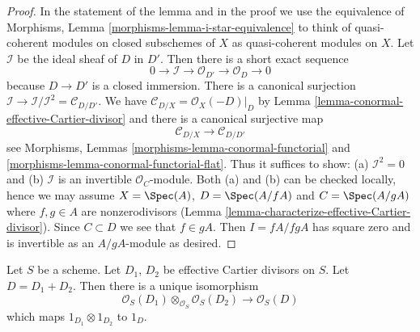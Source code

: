 \begin{proof}
In the statement of the lemma and in the proof we use the equivalence of
Morphisms, Lemma \ref{morphisms-lemma-i-star-equivalence} to think of
quasi-coherent modules on closed subschemes of $X$
as quasi-coherent modules on $X$. Let $\mathcal{I}$ be the ideal
sheaf of $D$ in $D'$. Then there is a short exact sequence
$$
0 \to \mathcal{I} \to \mathcal{O}_{D'} \to \mathcal{O}_D \to 0
$$
because $D \to D'$ is a closed immersion. There is a
canonical surjection
$\mathcal{I} \to \mathcal{I}/\mathcal{I}^2 = \mathcal{C}_{D/D'}$.
We have $\mathcal{C}_{D/X} = \mathcal{O}_X(-D)|_D$ by
Lemma \ref{lemma-conormal-effective-Cartier-divisor}
and there is a canonical surjective map
$$
\mathcal{C}_{D/X} \longrightarrow \mathcal{C}_{D/D'}
$$
see Morphisms, Lemmas \ref{morphisms-lemma-conormal-functorial} and
\ref{morphisms-lemma-conormal-functorial-flat}.
Thus it suffices to show: (a) $\mathcal{I}^2 = 0$ and (b)
$\mathcal{I}$ is an invertible $\mathcal{O}_C$-module.
Both (a) and (b) can be checked locally, hence we may assume
$X = \Spec(A)$, $D = \Spec(A/fA)$ and $C = \Spec(A/gA)$ where
$f, g \in A$ are nonzerodivisors
(Lemma \ref{lemma-characterize-effective-Cartier-divisor}).
Since $C \subset D$ we see
that $f \in gA$. Then $I = fA/fgA$ has square zero and is invertible
as an $A/gA$-module as desired.
\end{proof}

\begin{lemma}
\label{lemma-invertible-sheaf-sum-effective-Cartier-divisors}
Let $S$ be a scheme.
Let $D_1$, $D_2$ be effective Cartier divisors on $S$.
Let $D = D_1 + D_2$.
Then there is a unique isomorphism
$$
\mathcal{O}_S(D_1) \otimes_{\mathcal{O}_S} \mathcal{O}_S(D_2)
\longrightarrow
\mathcal{O}_S(D)
$$
which maps $1_{D_1} \otimes 1_{D_2}$ to $1_D$.
\end{lemma}

